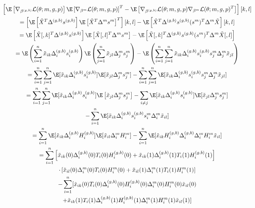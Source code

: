 \documentclass[12pt]{article}
\begin{document}
\begin{multline*}
\left[ \E \left[\nabla_{\beta^{(g,b)}} \mathcal{L}(\theta; m, g, p) \right] \E \left[\nabla_{\beta^m} \mathcal{L}(\theta; m, g, p) \right]^T - \E \left[ \nabla_{\beta^{(g,b)}} \mathcal{L}(\theta; m, g, p) \nabla_{\beta^m} \mathcal{L}(\theta; m, g, p)^T \right] \right][k,l] \\ 
= \left[ \E \left[ \tilde{X}^T \Delta^{(g,b)} s^{(g,b)} \right]\E \left[ \tilde{X}^T \Delta^m s^m \right]^T\right][k,l] - \E \left[ \tilde{X}^T \Delta^{(g,b)} s^{(g,b)} (s^m)^T \Delta^m \tilde{X} \right][k,l] \\ 
= \E\left[\tilde{X}[,k]^T \Delta^{(g,b)} s^{(g,b)} \right] \E \left[\tilde{X}[,l]^T \Delta^m s^m \right] - \E \left[\tilde{X}[,k]^T \Delta^{(g,b)} s^{(g,b)} (s^m)^T \Delta^m \tilde{X}[,l ] \right] \\
=\E\left( \sum_{i=1}^n \tilde{x}_{ik} \Delta^{(g,b)}_i s^{(g,b)}_i \right) \E \left( \sum_{j=1}^n \tilde{x}_{jl} \Delta^m_j s^m_j \right) - \E \left( \sum_{i=1}^n \sum_{j=1}^n \tilde{x}_{ik} \Delta^{(g,b)}_i s^{(g,b)}_i s^m_j \Delta^m_j \tilde{x}_{jl} \right) \\ 
= \sum_{i=1}^n \sum_{j=1}^n \E[\tilde{x}_{ik} \Delta^{(g,b)}_is^{(g,b)}_i] \E[ \tilde{x}_{jl} \Delta^m_j s^m_j ] - \sum_{i=1}^n \sum_{j=1}^n \E[ \tilde{x}_{ik} \Delta^{(g,b)}_i s^{(g,b)}_i s^m_j \Delta^m_j \tilde{x}_{jl}]  \\
= \sum_{i=1}^n \sum_{j=1}^n \E[ \tilde{x}_{ik} \Delta^{(g,b)}_i s^{(g,b)}_i] \E \left[\tilde{x}_{jl} \Delta^m_j s^m_j \right]  - \sum_{i \neq j} \E[\tilde{x}_{ik} \Delta^{(g,b)}_i s^{(g,b)}_i] \E[\tilde{x}_{jl}\Delta^m_j  s^m_j ] \\ - \sum_{i=1}^n \E[\tilde{x}_{ik} \Delta^{(g,b)}_i s^{(g,b)}_i s^m_i \Delta^m_i \tilde{x}_{il}] \\
= \sum_{i=1}^n \E[\tilde{x}_{ik} \Delta^{(g,b)}_i H^{(g,b)}_i] \E[\tilde{x}_{il} \Delta_i^m H^m_i] - \sum_{i=1}^n \E[\tilde{x}_{ik} H_i^{(g,b)} \Delta_i^{(g,b)} \Delta_i^m H_i^m \tilde{x}_{il}] \\ 
= \sum_{i=1}^n \left[\tilde{x}_{ik}(0) {\Delta}^{(g,b)}_i(0) T_i(0) {H}^{(g,b)}_i(0) + \tilde{x}_{ik}(1) {\Delta}^{(g,b)}_i(1) T_i(1) {H}^{(g,b)}_i(1)\right] \\ 
\cdot \left[\tilde{x}_{il}(0) {\Delta}^m_i(0) T_i(0) {H}^m_i(0) + \tilde{x}_{il}(1) {\Delta}^m_i(1) T_i(1) {H}^m_i(1)\right] 
\\ - \sum_{i=1}^n [\tilde{x}_{ik}(0) T_i(0) {\Delta}^{(g,b)}_i(0) {H}^{(g,b)}_i(0) {\Delta}^m_i(0) {H}^m_i(0) \tilde{x}_{il}(0) \\ + \tilde{x}_{ik}(1) T_i(1) {\Delta}^{(g,b)}_i(1) {H}^{(g,b)}_i(1) {\Delta}^m_i(1) {H}^m_i(1) \tilde{x}_{il}(1) ] 

\end{multline*}
\end{document}
